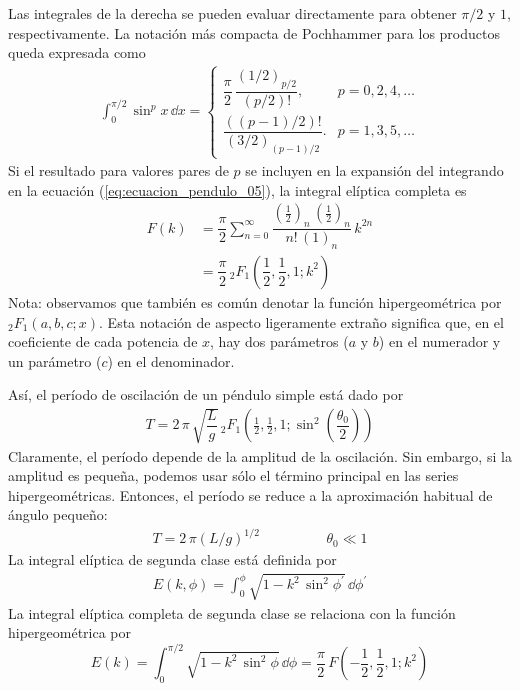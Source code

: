 Las integrales de la derecha se pueden evaluar directamente para obtener $\pi/2$ y $1$, respectivamente. La notación más compacta de Pochhammer para los productos queda expresada como
\begin{align*}
\int_{0}^{\pi/2} \sin^{p} x \, \dd{x} = \begin{cases}
\dfrac{\pi}{2} \, \dfrac{\left( 1/2 \right)_{p/2}}{(p/2)!}, & p = 0, 2, 4, \ldots \\[1em]
\dfrac{((p-1)/2)!}{(3/2)_{(p-1)/2}}. & p = 1, 3, 5, \ldots
\end{cases}
\end{align*}
Si el resultado para valores pares de $p$ se incluyen en la expansión del integrando en la ecuación (\ref{eq:ecuacion_pendulo_05}), la integral elíptica completa es
\begin{align*}
F(k) &= \dfrac{\pi}{2} \sum_{n=0}^{\infty} \dfrac{\left(\frac{1}{2} \right)_{n} \, \left(\frac{1}{2} \right)_{n}}{n! \, (1)_{n}} \, k^{2n} \\[0.5em]
&= \dfrac{\pi}{2} \, {}_{2} F_{1} \left( \dfrac{1}{2}, \dfrac{1}{2}, 1; k^{2} \right)
\end{align*}
Nota: observamos que también es común denotar la función hipergeométrica por ${}_{2} F_{1} (a, b, c; x)$. Esta notación de aspecto ligeramente extraño significa que, en el coeficiente de cada potencia de $x$, hay dos parámetros ($a$ y $b$) en el numerador y un parámetro ($c$) en el denominador.
\par
Así, el período de oscilación de un péndulo simple está dado por
\begin{align*}
T = 2 \, \pi \, \sqrt{\dfrac{L}{g}} \, {}_{2} F_{1} \left(\frac{1}{2}, \frac{1}{2}, 1; \sin^{2} \left( \dfrac{\theta_{0}}{2} \right) \right)
\end{align*}
Claramente, el período depende de la amplitud de la oscilación. Sin embargo, si la amplitud es pequeña, podemos usar sólo el término principal en las series hipergeométricas. Entonces, el período se reduce a la aproximación habitual de ángulo pequeño:
\begin{align*}
T = 2 \, \pi (L / g)^{1/2} \hspace{2cm} \theta_{0} \ll 1
\end{align*}
La integral elíptica de segunda clase está definida por
\begin{align*}
E (k, \phi) = \int_{0}^{\phi} \sqrt{1 - k^{2} \, \sin^{2} \phi^{\prime}} \, \dd{\phi^{\prime}}
\end{align*}
La integral elíptica completa de segunda clase se relaciona con la función hipergeométrica por
\begin{equation}
E(k) = \int_{0}^{\pi/2} \sqrt{1 - k^{2} \, \sin^{2} \phi} \, \dd{\phi} =  \dfrac{\pi}{2} \, F \left( -\dfrac{1}{2}, \dfrac{1}{2}, 1; k^{2} \right)
\end{equation}
